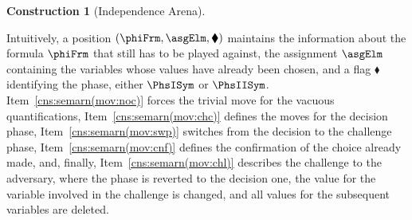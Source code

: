 \documentclass[authoryear]{elsarticle}
\newtheorem{construction}{Construction}
\begin{document}
\begin{construction}[Independence Arena]
\begin{enumerate}[1)]
\begin{enumerate}[a)]
          \!\mapsto\! \aElm], \PhsISym)$, for some $\aElm \!\in\! \ASet$;
        \item\label{cns:semarn(mov:swp)}
          $\posElm[1] = (\psiFrm, \asgElm, \PhsISym)$ and $\posElm[2] =
          (\varphiSnt, \asgElm, \PhsIISym)$;
        \item\label{cns:semarn(mov:cnf)}
          $\posElm[1] = (\Qnt[][_{\pm\WSet}] \varElm \ldotp \phiFrm', \asgElm,
          \PhsIISym)$ and $\posElm[2] = (\phiFrm', \asgElm, \PhsIISym)$;
        \item\label{cns:semarn(mov:chl)}
          $\posElm[1] = (\Qnt[][_{\pm\WSet}] \varElm \ldotp \phiFrm'\!, \asgElm,
          \PhsIISym)$ and $\posElm[2] \!=\! (\phiFrm'\!, \asgElm'[\varElm
          \!\mapsto\! \aElm], \PhsISym)$, for some $\aElm \!\in\! \ASet$ with
          $\aElm \neq \asgElm(\varElm)$, where $\asgElm'  \asgElm \!\rst
          $.
      \end{enumerate}
  \end{enumerate}
\end{construction}
Intuitively, a position $(\phiFrm, \asgElm, \blacklozenge)$ maintains the
information about the formula $\phiFrm$ that still has to be played against, the
assignment $\asgElm$ containing the variables whose values have already been
chosen, and a flag $\blacklozenge$ identifying the phase, either $\PhsISym$ or
$\PhsIISym$.
Item~\ref{cns:semarn(mov:noc)} forces the trivial move for the vacuous
quantifications, Item~\ref{cns:semarn(mov:chc)} defines the moves for the
decision phase, Item~\ref{cns:semarn(mov:swp)} switches from the decision to the
challenge phase, Item~\ref{cns:semarn(mov:cnf)} defines the confirmation of the
choice already made, and, finally, Item~\ref{cns:semarn(mov:chl)} describes the
challenge to the adversary, where the phase is reverted to the decision one, the
value for the variable involved in the challenge is changed, and all values for
the subsequent variables are deleted.
\end{document}
